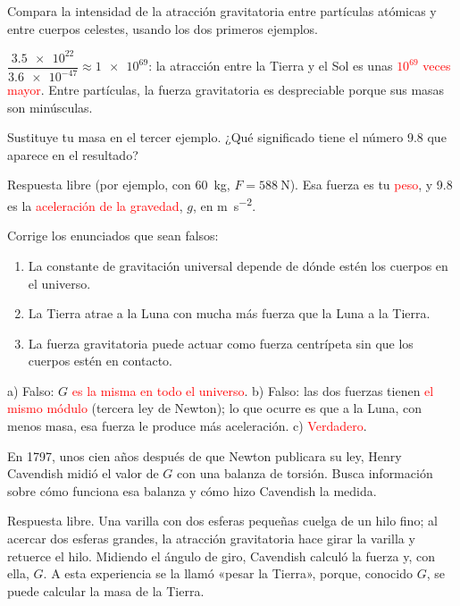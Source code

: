 \begin{exercise}
    Compara la intensidad de la atracción gravitatoria entre partículas atómicas y entre cuerpos celestes, usando los dos primeros ejemplos.
    \begin{solu}
        \(\dfrac{\num{3.5e22}}{\num{3.6e-47}} \approx \num{1e69}\): la atracción entre la Tierra y el Sol es unas \textcolor{red}{\(10^{69}\) veces mayor}. Entre partículas, la fuerza gravitatoria es despreciable porque sus masas son minúsculas.
    \end{solu}
\end{exercise}

\begin{exercise}
    Sustituye tu masa en el tercer ejemplo. ¿Qué significado tiene el número \num{9.8} que aparece en el resultado?
    \begin{solu}
        Respuesta libre (por ejemplo, con \qty{60}{\kg}, \(F = \qty{588}{\newton}\)). Esa fuerza es tu \textcolor{red}{peso}, y \num{9.8} es la \textcolor{red}{aceleración de la gravedad}, \(g\), en \unit{\m\per\square\s}.
    \end{solu}
\end{exercise}

\begin{exercise}
    Corrige los enunciados que sean falsos:
    \begin{enumerate}[label=\alph*)]
        \item La constante de gravitación universal depende de dónde estén los cuerpos en el universo.
        \item La Tierra atrae a la Luna con mucha más fuerza que la Luna a la Tierra.
        \item La fuerza gravitatoria puede actuar como fuerza centrípeta sin que los cuerpos estén en contacto.
    \end{enumerate}
    \begin{solu}
        a) Falso: \(G\) \textcolor{red}{es la misma en todo el universo}. b) Falso: las dos fuerzas tienen \textcolor{red}{el mismo módulo} (tercera ley de Newton); lo que ocurre es que a la Luna, con menos masa, esa fuerza le produce más aceleración. c) \textcolor{red}{Verdadero}.
    \end{solu}
\end{exercise}

\begin{exercise}
    En 1797, unos cien años después de que Newton publicara su ley, Henry Cavendish midió el valor de \(G\) con una balanza de torsión. Busca información sobre cómo funciona esa balanza y cómo hizo Cavendish la medida.
    \begin{solu}
        Respuesta libre. Una varilla con dos esferas pequeñas cuelga de un hilo fino; al acercar dos esferas grandes, la atracción gravitatoria hace girar la varilla y retuerce el hilo. Midiendo el ángulo de giro, Cavendish calculó la fuerza y, con ella, \(G\). A esta experiencia se la llamó «pesar la Tierra», porque, conocido \(G\), se puede calcular la masa de la Tierra.
    \end{solu}
\end{exercise}

